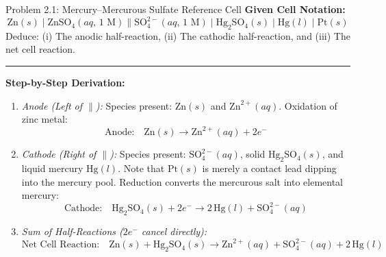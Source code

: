 \documentclass[10pt,a4paper]{article}
\begin{document}
\begin{examplebox}{Problem 2.1: Mercury--Mercurous Sulfate Reference Cell}
\textbf{Given Cell Notation:}
\begin{equation*}
    \text{Zn}(s) \mid \text{ZnSO}_4(aq,\, 1\text{ M}) \parallel \text{SO}_4^{2-}(aq,\, 1\text{ M}) \mid \text{Hg}_2\text{SO}_4(s) \mid \text{Hg}(l) \mid \text{Pt}(s)
\end{equation*}
Deduce: (i) The anodic half-reaction, (ii) The cathodic half-reaction, and (iii) The net cell reaction.

\vspace{0.3cm}\hrule\vspace{0.3cm}
\textbf{Step-by-Step Derivation:}
\begin{enumerate}
    \item \textit{Anode (Left of $\parallel$):}
    Species present: $\text{Zn}(s)$ and $\text{Zn}^{2+}(aq)$. Oxidation of zinc metal:
    $$\text{Anode:} \quad \text{Zn}(s) \longrightarrow \text{Zn}^{2+}(aq) + 2e^-$$
    \item \textit{Cathode (Right of $\parallel$):}
    Species present: $\text{SO}_4^{2-}(aq)$, solid $\text{Hg}_2\text{SO}_4(s)$, and liquid mercury $\text{Hg}(l)$. Note that $\text{Pt}(s)$ is merely a contact lead dipping into the mercury pool. Reduction converts the mercurous salt into elemental mercury:
    $$\text{Cathode:} \quad \text{Hg}_2\text{SO}_4(s) + 2e^- \longrightarrow 2\,\text{Hg}(l) + \text{SO}_4^{2-}(aq)$$
    \item \textit{Sum of Half-Reactions ($2e^-$ cancel directly):}
    $$\text{Net Cell Reaction:} \quad \text{Zn}(s) + \text{Hg}_2\text{SO}_4(s) \longrightarrow \text{Zn}^{2+}(aq) + \text{SO}_4^{2-}(aq) + 2\,\text{Hg}(l)$$
\end{enumerate}
\end{examplebox}
\end{document}
